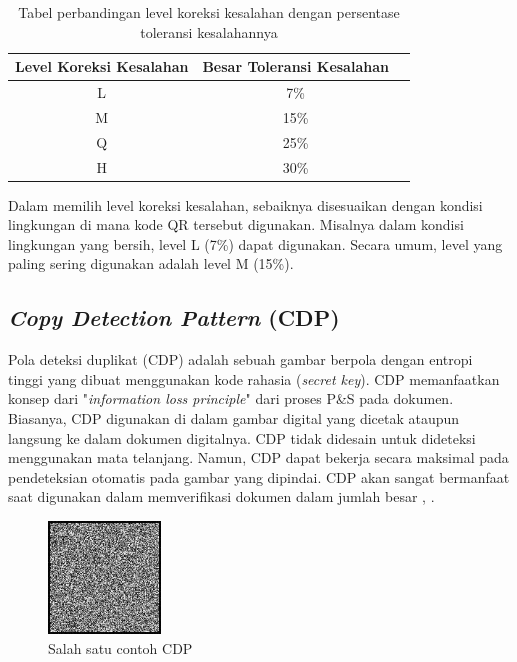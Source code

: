 \begin{table}[h]
	\caption{Tabel perbandingan level koreksi kesalahan dengan persentase toleransi kesalahannya}
	\vspace{0.5em}
	\centering
	\begin{tabular}{|c|c|c|}
		\hline
		Level Koreksi Kesalahan & Besar Toleransi Kesalahan \\
		\hline
		L                       & 7\%                       \\
		M                       & 15\%                      \\
		Q                       & 25\%                      \\
		H                       & 30\%                      \\ \hline
	\end{tabular}
	\label{Tab: 2-tabelperbandinganlevelkoreksi}
\end{table}

Dalam memilih level koreksi kesalahan, sebaiknya disesuaikan dengan kondisi lingkungan di mana kode QR tersebut digunakan. Misalnya dalam kondisi lingkungan
yang bersih, level L (7\%) dapat digunakan. Secara umum, level yang paling sering digunakan adalah level M (15\%).

\subsection{\emph{Copy Detection Pattern} (CDP)}
Pola deteksi duplikat (CDP) adalah sebuah gambar berpola dengan entropi tinggi yang dibuat menggunakan kode rahasia (\emph{secret key}). CDP memanfaatkan
konsep dari "\emph{information loss principle}" dari proses P\&S pada dokumen. Biasanya, CDP digunakan di dalam gambar digital yang dicetak ataupun langsung ke
dalam dokumen digitalnya. CDP tidak didesain untuk dideteksi menggunakan mata telanjang. Namun, CDP dapat bekerja secara maksimal pada pendeteksian otomatis
pada gambar yang dipindai. CDP akan sangat bermanfaat saat digunakan dalam memverifikasi dokumen dalam jumlah besar \cite{picard2004digital},
\cite{picard2004towards}.

\begin{figure}[h]
	\centering
	\includegraphics[width=3cm]{contents/chapter-2/2-contohcdp.jpg}
	\caption{Salah satu contoh CDP}
	\label{Fig: 2-contohcdp}
\end{figure}

